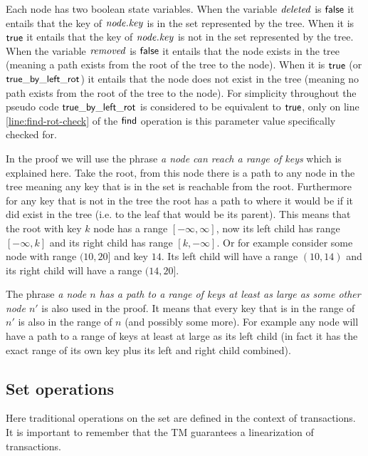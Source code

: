 Each node has two boolean state variables.
When the variable $\ms{deleted}$ is $\lit{false}$ it entails that the key of $\ms{node.key}$ is in the set represented by the tree.
When it is $\lit{true}$ it entails that the key of $\ms{node.key}$ is not in the set represented by the tree.
When the variable $\ms{removed}$ is $\lit{false}$ it entails that the node exists in the tree (meaning a path exists from the root of the tree to the node).
When it is $\lit{true}$ (or $\lit{true\_by\_left\_rot}$) it entails that the node does not exist in the tree (meaning no path exists from the root of the tree to the node).
For simplicity throughout the pseudo code $\lit{true\_by\_left\_rot}$ is considered to be equivalent to $\lit{true}$, only on line \ref{line:find-rot-check} of the $\lit{find}$ operation is this
parameter value specifically checked for.

In the proof we will use the phrase \emph{a node can reach a range of keys} which is explained here.
Take the root, from this node there is a path to any node in the tree meaning any key that is in the set is reachable from the root.
Furthermore for any key that is not in the tree the root has a path to where it would be if it did exist in the tree (i.e. to the leaf that would be its parent).
This means that the root with key $k$ node has a range $[-\infty, \infty]$,
now its left child has range $[-\infty,k]$ and its right child has range $[k,-\infty]$.
Or for example consider some node with range $(10, 20]$ and key $14$.
Its left child will have a range $(10, 14)$ and its right child will have a range $(14, 20]$.

The phrase \emph{a node $n$ has a path to a range of keys at least as large as some other node $n'$} is also used in the proof.
It means that every key that is in the range of
$n'$ is also in the range of $n$ (and possibly some more).
For example any node will have a path to a range of keys at least at large as its left child (in fact it has the exact range of
its own key plus its left and right child combined).

\subsection{Set operations}
Here traditional operations on the set are defined in the context of transactions.
It is important to remember that the TM guarantees a linearization of transactions.

